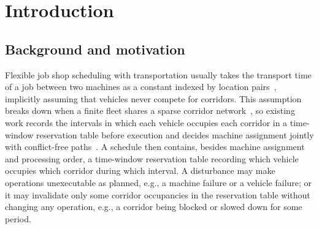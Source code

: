 \documentclass[manuscript,screen,review]{acmart}
\begin{document}


\maketitle

\section{Introduction}
\label{sec:introduction}

\subsection{Background and motivation}

Flexible job shop scheduling with transportation usually takes the transport time of a job between two machines as a constant indexed by location pairs~\cite{xin2025review,meng2025cp,qin2026knowledge},
implicitly assuming that vehicles never compete for corridors. This assumption breaks down when a finite fleet shares a sparse corridor network~\cite{kim2026congestion},
so existing work records the intervals in which each vehicle occupies each corridor in a time-window reservation table before execution and decides machine assignment jointly with conflict-free paths~\cite{vanos2026exact,sun2023integrated,lyu2019approach,li2026framework}.
A schedule then contains, besides machine assignment and processing order, a time-window reservation table recording which vehicle occupies which corridor during which interval.
A disturbance may make operations unexecutable as planned, e.g., a machine failure or a vehicle failure;
or it may invalidate only some corridor occupancies in the reservation table without changing any operation, e.g., a corridor being blocked or slowed down for some period.
\end{document}
